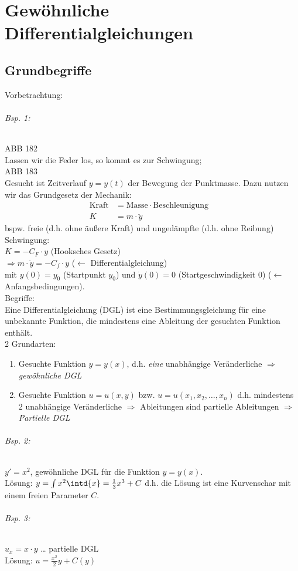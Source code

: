 \chapter{Gewöhnliche Differentialgleichungen}
\section{Grundbegriffe}
Vorbetrachtung:
\subparagraph{Bsp. 1:} \parskp
ABB 182\\
Lassen wir die Feder los, so kommt es zur Schwingung;\\
ABB 183\\
Gesucht ist Zeitverlauf $y=y(t)$ der Bewegung der Punktmasse. Dazu nutzen wir das Grundgesetz der Mechanik:
\begin{align*}
\text{Kraft} &= \text{Masse} \cdot \text{Beschleunigung}& \\
K &= m \cdot \ddot{y}
\end{align*}
bspw. freie (d.h. ohne äußere Kraft) und ungedämpfte (d.h. ohne Reibung) Schwingung:\\
$K=-C_F \cdot y$ (Hooksches Gesetz)\\
$\Rightarrow m \cdot \ddot{y}=-C_f \cdot y$ ($\leftarrow$ Differentialgleichung)\\
mit $y(0)=y_0$ (Startpunkt $y_0$) und $\dot{y}(0)=0$ (Startgeschwindigkeit $0$) ($\leftarrow$ Anfangsbedingungen).\\
Begriffe:\\
Eine Differentialgleichung (DGL) ist eine Bestimmungsgleichung für eine unbekannte Funktion, die mindestens eine Ableitung der gesuchten Funktion enthält.\\
2 Grundarten:
\begin{enumerate}
\item Gesuchte Funktion $y=y(x)$, d.h. \emph{eine} unabhängige Veränderliche $\Rightarrow$ \emph{gewöhnliche DGL}
\item Gesuchte Funktion $u=u(x,y)$ bzw. $u=u(x_1, x_2,\dots, x_n)$ d.h. mindestens 2 unabhängige Veränderliche $\Rightarrow$ Ableitungen sind partielle Ableitungen $\Rightarrow$ \emph{Partielle DGL}
\end{enumerate}
\subparagraph{Bsp. 2:} $y'=x^2$, gewöhnliche DGL für die Funktion $y=y(x)$.\\
Lösung: $y=\int x^2 \intd{x}=\frac{1}{3}x^3+C$ d.h. die Lösung ist eine Kurvenschar mit einem freien Parameter $C$.
\subparagraph{Bsp. 3:} $u_x=x\cdot y$ … partielle DGL\\
Lösung: $u=\frac{x^2}{2}y+C(y)$\\
